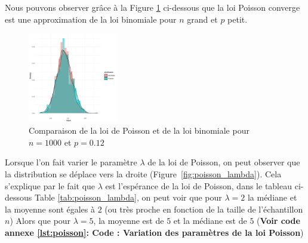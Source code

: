       Nous pouvons observer grâce à la Figure \ref{fig:poisson_binomiale} ci-dessous que la loi Poisson converge est une approximation de la loi binomiale pour $n$ grand et $p$ petit.
      \begin{figure}[H]
        \centering
        \includegraphics[width=0.35\textwidth]{4_attachments/figures/output6.png}
        \caption{Comparaison de la loi de Poisson et de la loi binomiale pour $n=1000$ et $p=0.12$}
        \label{fig:poisson_binomiale}
      \end{figure}

      Lorsque l'on fait varier le paramètre $\lambda$ de la loi de Poisson, on peut observer que la distribution se déplace vers la droite (Figure~\ref{fig:poisson_lambda}). Cela s'explique par le fait que $\lambda$ est l'espérance de la loi de Poisson, dans le tableau ci-dessous Table \ref{tab:poisson_lambda}, on peut voir que pour $\lambda=2$ la médiane et la moyenne sont égales à $2$ (ou très proche en fonction de la taille de l'échantillon $n$)
      Alors que pour $\lambda=5$, la moyenne est de $5$ et la médiane est de $5$ (\textbf{Voir code annexe \ref{lst:poisson}: Code :  Variation des paramètres de la loi Poisson})

